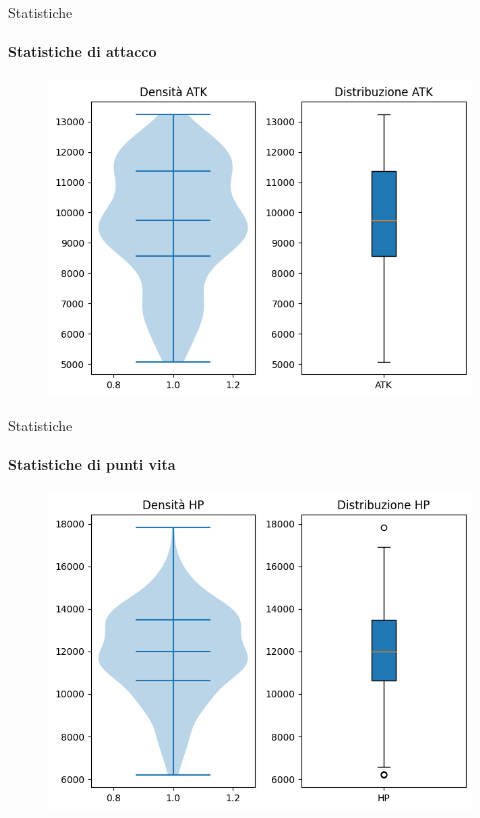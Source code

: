 \documentclass{beamer}
\begin{document}
\begin{darkframes}
  \begin{frame}{Statistiche}
    \framesubtitle{Statistiche di attacco}
    \begin{figure}
      \centering
      \includegraphics[scale=0.6]{./images/box_atk.png}
    \end{figure}
  \end{frame}

  \begin{frame}{Statistiche}
    \framesubtitle{Statistiche di punti vita}
    \begin{figure}
      \centering
      \includegraphics[scale=0.6]{./images/box_hp.png}
    \end{figure}
  \end{frame}


\end{darkframes}
\end{document}
